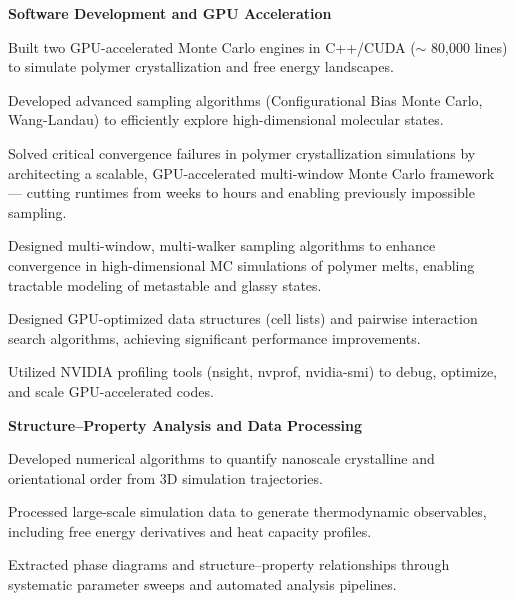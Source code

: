 \documentclass[letterpaper,12pt]{article}
\begin{document}
\vspace{0.5em}
\textbf{Software Development and GPU Acceleration}
\begin{tabitemize}[leftmargin=*]
  \item Built two GPU-accelerated Monte Carlo engines in C++/CUDA ($\sim$ 80,000 lines) to simulate polymer crystallization and free energy landscapes.
    \item Developed advanced sampling algorithms (Configurational Bias Monte Carlo, Wang-Landau) to efficiently explore high-dimensional molecular states.
    \item Solved critical convergence failures in polymer crystallization simulations by architecting a scalable, GPU-accelerated multi-window Monte Carlo framework — cutting runtimes from weeks to hours and enabling previously impossible sampling.
    \item Designed multi-window, multi-walker sampling algorithms to enhance convergence in high-dimensional MC simulations of polymer melts, enabling tractable modeling of metastable and glassy states.
    \item Designed GPU-optimized data structures (cell lists) and pairwise interaction search algorithms, achieving significant performance improvements.
    \item Utilized NVIDIA profiling tools (nsight, nvprof, nvidia-smi) to debug, optimize, and scale GPU-accelerated codes.
\end{tabitemize}

\vspace{0.5em}
\textbf{Structure–Property Analysis and Data Processing}
\begin{tabitemize}[leftmargin=*]
    \item Developed numerical algorithms to quantify nanoscale crystalline and orientational order from 3D simulation trajectories.
    \item Processed large-scale simulation data to generate thermodynamic observables, including free energy derivatives and heat capacity profiles.
    \item Extracted phase diagrams and structure–property relationships through systematic parameter sweeps and automated analysis pipelines.
\end{tabitemize}
\end{document}
